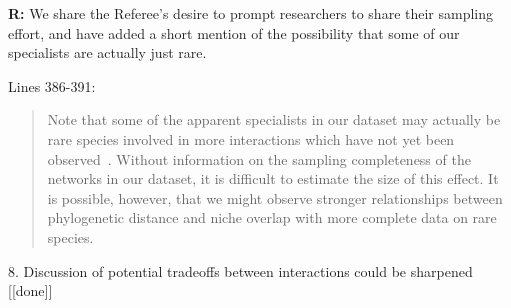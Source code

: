 \documentclass[12pt]{letter}
\begin{document}
		\textbf{R:} We share the Referee's desire to prompt researchers to share their sampling effort, and have added a short mention of the possibility  that some of our specialists are actually just rare.


		Lines 386-391:

		\begin{quotation}

			Note that some of the apparent specialists in our dataset may actually be rare species involved in more interactions which have not yet been observed~\citep{Bluthgen2006,Poisot2015}. Without information on the sampling completeness of the networks in our dataset, it is difficult to estimate the size of this effect. 
			It is possible, however, that we might observe stronger relationships between phylogenetic
			distance and niche overlap with more complete data on rare species.

		\end{quotation}


	8. Discussion of potential tradeoffs between interactions could be sharpened [[done]]
\end{document}
